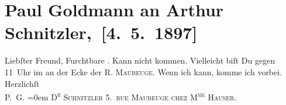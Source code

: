 

         
         \renewcommand{\erwaehntePersonen}{Personen:  Hauser}
         \renewcommand{\erwaehnteOrte}{Orte: Bazar de la Charité, Paris, Rue Jean Goujon, rue de Maubeuge}
         \renewcommand{\erwaehnteWerke}{}
               \section[ Paul Goldmann an Arthur Schnitzler, {[}4. 5. 1897{]}]{ Paul Goldmann an Arthur Schnitzler, {[}4. 5. 1897{]}}\nopagebreak{}\rehead{ }\begin{ledgroupsized}[t]{13cm}\normalsize\beginnumbering \toendnotes[C]{\smallbreak\pagebreak[2]} 
\toendnotes[C]{\smallbreak}\pstart\center{}{\pb}Liebſter Freund,\pend\pstart
           Furchtbare \label{K_L02811-1v}\label{K_L02811-1h}. Kann nicht kommen. Vielleicht biſt Du gegen
                  11 Uhr im \label{K_L02811-2v}\label{K_L02811-2h} an der Ecke der
                  \textsc{R. Maubeuge}. Wenn ich kann, komme ich vorbei.\pend
           \pstart
           Herzlichſt {\\[\baselineskip]}\spacefill\mbox{P. G.}\pend
           \leftskip=0em{}\pstart
           \noindent{}\textsc{D\textsuperscript{r} Schnitzler}\pend
           \pstart
           \textsc{5. rue Maubeuge}\pend
           \pstart
           \textsc{chez{ }M\textsuperscript{me}{ }Hauser}.\pend
           
         
         \endnumbering{}\end{ledgroupsized}  \newcommand{\dateiname}{L02811}\newcommand{\titel}{Paul Goldmann an Arthur Schnitzler, [4. 5. 1897]}\newcommand{\editorInnen}{Martin Anton Müller und Laura Untner}
      